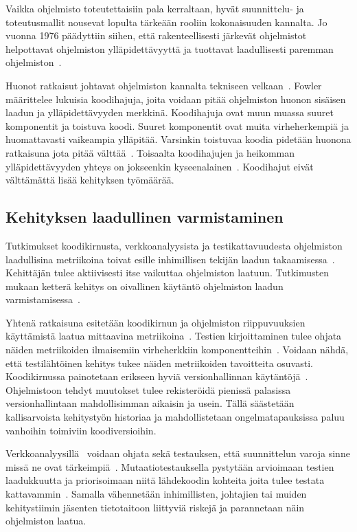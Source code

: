 \documentclass[finnish]{../tktltiki2}
\theoremstyle{definition}
\theoremstyle{remark}
\begin{document}
    Vaikka ohjelmisto toteutettaisiin pala kerraltaan, hyvät suunnittelu- ja toteutusmallit nousevat lopulta tärkeään 
rooliin kokonaisuuden kannalta. Jo vuonna 1976 päädyttiin siihen, että rakenteellisesti järkevät ohjelmistot helpottavat 
ohjelmiston ylläpidettävyyttä ja tuottavat laadullisesti paremman ohjelmiston~\cite{LK76}.

    Huonot ratkaisut johtavat ohjelmiston kannalta tekniseen velkaan~\cite{FFS12}. Fowler määrittelee lukuisia 
koodihajuja, joita voidaan pitää ohjelmiston huonon sisäisen laadun ja ylläpidettävyyden merkkinä. Koodihajuja ovat muun 
muassa suuret komponentit ja toistuva koodi. Suuret komponentit ovat muita virheherkempiä ja huomattavasti vaikeampia 
ylläpitää. Varsinkin toistuvaa koodia pidetään huonona ratkaisuna jota pitää välttää~\cite{FFS12}. Toisaalta 
koodihajujen ja heikomman ylläpidettävyyden yhteys on jokseenkin kyseenalainen~\cite{SYAMD12}. Koodihajut eivät 
välttämättä lisää kehityksen työmäärää.

\subsection{Kehityksen laadullinen varmistaminen}

Tutkimukset koodikirnusta, verkkoanalyysista ja testikattavuudesta ohjelmiston laadullisina metriikoina toivat esille 
inhimillisen tekijän laadun takaamisessa~\cite{NB05, ZN08, MNDT09}. Kehittäjän tulee aktiivisesti itse vaikuttaa 
ohjelmiston laatuun. Tutkimusten mukaan ketterä kehitys on oivallinen käytäntö ohjelmiston laadun 
varmistamisessa~\cite{SS10}.

    Yhtenä ratkaisuna esitetään koodikirnun ja ohjelmiston riippuvuuksien käyttämistä laatua mittaavina 
metriikoina~\cite{NB05, NB07}. Testien kirjoittaminen tulee ohjata näiden metriikoiden ilmaisemiin virheherkkiin 
komponentteihin~\cite{MNDT09}. Voidaan nähdä, että testilähtöinen kehitys tukee näiden metriikoiden tavoitteita 
osuvasti. Koodikirnussa painotetaan erikseen hyviä versionhallinnan käytäntöjä~\cite{NB05}. Ohjelmistoon tehdyt 
muutokset tulee rekisteröidä pienissä palasissa versionhallintaan mahdollisimman aikaisin ja usein. Tällä säästetään 
kallisarvoista kehitystyön historiaa ja mahdollistetaan ongelmatapauksissa paluu vanhoihin toimiviin koodiversioihin.

    Verkkoanalyysillä~\cite{ZN08} voidaan ohjata sekä testauksen, että suunnittelun varoja sinne missä ne ovat 
tärkeimpiä~\cite{NB07, MNDT09}. Mutaatiotestauksella pystytään arvioimaan testien laadukkuutta ja priorisoimaan niitä 
lähdekoodin kohteita joita tulee testata kattavammin~\cite{YH11}. Samalla vähennetään inhimillisten, johtajien tai 
muiden kehitystiimin jäsenten tietotaitoon liittyviä riskejä ja parannetaan näin ohjelmiston laatua.
\end{document}

